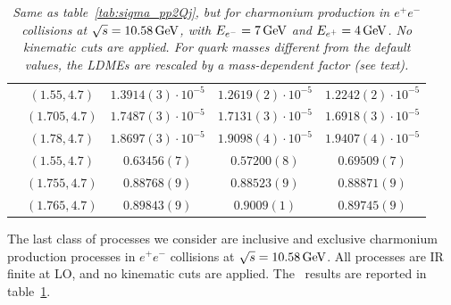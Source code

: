 \begin{table}[t!]
\begin{tabular}[t]{lcccc}
\hdashline
\multirow{3}{*}{$\chi_{c0} + \chi_{c2}$}
& $(1.55,4.7)$ & $1.3914(3)\cdot10^{-5}$ & $1.2619(2)\cdot10^{-5}$ & $1.2242(2)\cdot10^{-5}$ \\ 
& $(1.705,4.7)$ & $1.7487(3)\cdot10^{-5}$ & $1.7131(3)\cdot10^{-5}$ & $1.6918(3)\cdot10^{-5}$ \\ 
& $(1.78,4.7)$ & $1.8697(3)\cdot10^{-5}$ & $1.9098(4)\cdot10^{-5}$ & $1.9407(4)\cdot10^{-5}$ \\  
\hdashline
\multirow{3}{*}{$\chi_{c1} + h_{c}$}
& $(1.55,4.7)$ & $0.63456(7)$ & $0.57200(8)$ & $0.69509(7)$ \\ 
& $(1.755,4.7)$ & $0.88768(9)$ & $0.88523(9)$ & $0.88871(9)$ \\ 
& $(1.765,4.7)$ & $0.89843(9)$ & $0.9009(1)$ & $0.89745(9)$ \\ 
\bottomrule
\end{tabular}
\caption{\it\small Same as table~\ref{tab:sigma_pp2Qj}, but for charmonium production in $e^+ e^-$ collisions at $\sqrt{s} = 10.58\,{\rm GeV}$, with $E_{e^-} = 7\,{\rm GeV}$ and $E_{e^+} = 4\,{\rm GeV}$. No kinematic cuts are applied. For quark masses different from the default values, the LDMEs are rescaled by a mass-dependent factor (see text).}
\label{tab:sigma_e+e-}
\end{table}

The last class of processes we consider are inclusive and exclusive charmonium production processes in $e^+ e^-$ collisions at $\sqrt{s} = 10.58\,{\rm GeV}$. All processes are IR finite at LO, and no kinematic cuts are applied. The \mgshort\ results are reported in table~\ref{tab:sigma_e+e-}.

